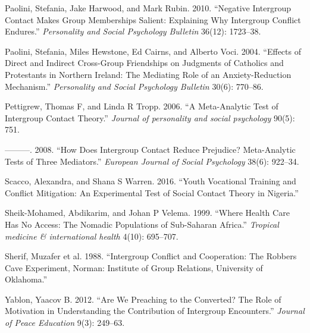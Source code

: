 \documentclass[11pt]{article}
\begin{document}
\hypertarget{ref-paolini2010negative}{}
Paolini, Stefania, Jake Harwood, and Mark Rubin. 2010. ``Negative
Intergroup Contact Makes Group Memberships Salient: Explaining Why
Intergroup Conflict Endures.'' \emph{Personality and Social Psychology
Bulletin} 36(12): 1723--38.

\hypertarget{ref-paolini2004effects}{}
Paolini, Stefania, Miles Hewstone, Ed Cairns, and Alberto Voci. 2004.
``Effects of Direct and Indirect Cross-Group Friendships on Judgments of
Catholics and Protestants in Northern Ireland: The Mediating Role of an
Anxiety-Reduction Mechanism.'' \emph{Personality and Social Psychology
Bulletin} 30(6): 770--86.

\hypertarget{ref-pettigrew2006meta}{}
Pettigrew, Thomas F, and Linda R Tropp. 2006. ``A Meta-Analytic Test of
Intergroup Contact Theory.'' \emph{Journal of personality and social
psychology} 90(5): 751.

\hypertarget{ref-pettigrew2008does}{}
---------. 2008. ``How Does Intergroup Contact Reduce Prejudice?
Meta-Analytic Tests of Three Mediators.'' \emph{European Journal of
Social Psychology} 38(6): 922--34.

\hypertarget{ref-Scacco2016}{}
Scacco, Alexandra, and Shana S Warren. 2016. ``Youth Vocational Training
and Conflict Mitigation: An Experimental Test of Social Contact Theory
in Nigeria.''

\hypertarget{ref-sheik1999health}{}
Sheik-Mohamed, Abdikarim, and Johan P Velema. 1999. ``Where Health Care
Has No Access: The Nomadic Populations of Sub-Saharan Africa.''
\emph{Tropical medicine \& international health} 4(10): 695--707.

\hypertarget{ref-Sherif1988robbersCave}{}
Sherif, Muzafer et al. 1988. ``Intergroup Conflict and Cooperation: The
Robbers Cave Experiment, Norman: Institute of Group Relations,
University of Oklahoma.''

\hypertarget{ref-yablon2012we}{}
Yablon, Yaacov B. 2012. ``Are We Preaching to the Converted? The Role of
Motivation in Understanding the Contribution of Intergroup Encounters.''
\emph{Journal of Peace Education} 9(3): 249--63.
\end{document}
